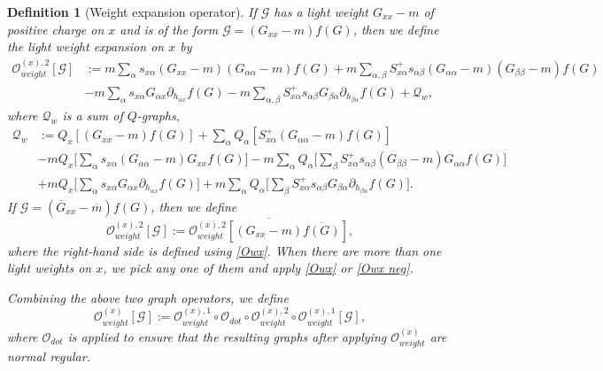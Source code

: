\documentclass{article}
\newcommand{\1}{\mathds{1}}
\numberwithin{equation}{section}
\newcommand{\al}{\alpha}
\newcommand{\be}{\begin{equation}}
\newcommand{\ee}{\end{equation}}
\renewcommand{\cal}{\mathcal}
\newcommand{\wh}{\widehat}
\theoremstyle{plain} %
\newtheorem{definition}[theorem]{Definition}
\theoremstyle{remark}
\begin{document}
\begin{definition} [Weight expansion operator]
	 If $\cal G$ has a light weight $G_{xx}-m$ of positive charge on $x$ and is of  the form $\cal G= (G_{xx}-m)f (G)$,  then we define the light weight expansion on $x$ by  
	\begin{align} 
		{\cal O}^{(x),2}_{weight} \left [  \cal G \right] &:=  m \sum_{  \al} s_{x\al}  (G_{xx}-m) (G_{\al\al}-m)f (G) +m \sum_{  \al,\beta}S^{+}_{x\al} s_{\al \beta}  (G_{\al\al}-m) (G_{\beta\beta}-m)f (G) \nonumber\\
		&-  m  \sum_{ \al} s_{x \al} G_{\al x}\partial_{ h_{ \al x}} f (G) -  m \sum_{ \al,\beta} S^{+}_{x\al}s_{\al \beta} G_{\beta \al}\partial_{ h_{ \beta\al}} f(G) + \cal Q_w ,\label{Owx}\end{align}
	where %
	$\cal Q_w$ is a sum of $Q$-graphs,
	\begin{align} 
		\cal Q_w &:=  Q_x \left[(G_{xx}  -  m) f(G)\right] + \sum_{\al} Q_\al \left[  S^{+}_{x\al}(G_{\al\al}  -  m) f(G)\right] \nonumber\\
		& - m  Q_x\Big[ \sum_{\al} s_{x\al}  (G_{\al\al}-m)G_{xx} f(G) \Big]  - m \sum_\al Q_\al\Big[ \sum_{ \beta}S_{x\al}^{+}s_{\al\beta}(G_{\beta\beta}-m)G_{\al\al} f(G) \Big] \nonumber\\
		&+  m  Q_x  \Big[  \sum_\al s_{x \al}  G_{\al x}\partial_{ h_{\al x}} f(G)\Big]+ m \sum_\al Q_\al \Big[  \sum_{ \beta} S^{+}_{x\al}s_{\al \beta} G_{\beta \al}\partial_{ h_{\beta \al}} f(G)\Big]. \nonumber
	\end{align} 
	If $\cal G= (\overline G_{xx}-\overline m)f (G)$, then we define 
	\be\label{Owx neg}
	{\cal O}^{(x),2}_{weight}\left [  \cal G \right] := \overline{ {\cal O}^{(x),2}_{weight} \left [  (G_{xx}  -  m) \overline{f(G)} \right ] } ,
	\ee
	where the right-hand side is defined using \eqref{Owx}. When there are more than one light weights on $x$, we pick any one of them and apply \eqref{Owx} or \eqref{Owx neg}. 
	
	Combining the above two graph operators, we define %
	\be\label{eq defOdot}
	{\cal O}_{weight}^{(x)}[ \cal G]:={\cal O}^{(x),1}_{weight} \circ\cal O_{dot} \circ  {\cal O}^{(x),2}_{weight} \circ {\cal O}^{(x),1}_{weight}  [\cal G], \ee
	where $\cal O_{dot}$ is applied to ensure that the resulting graphs after applying ${\cal O}_{weight}^{(x)}$ are normal regular. %
	

\end{definition}
\end{document}
